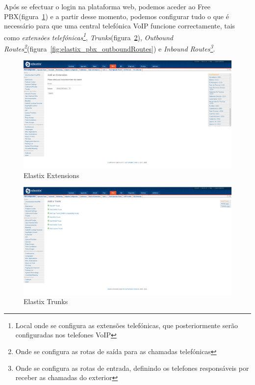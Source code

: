 Após se efectuar o login na plataforma web, podemos aceder ao Free PBX(figura~\ref{fig:elastix_pbx_extensions}) e a partir
desse momento, podemos configurar tudo o que é necessário para que uma central telefónica VoIP funcione correctamente, tais como \emph{extensões telefónicas\footnote{Local onde se configura as extensões telefónicas, que posteriormente serão configuradas nos telefones VoIP}}, \emph{Trunks}(figura~\ref{fig:elastix_pbx_trunk}), \emph{Outbound Routes\footnote{Onde se configura as rotas de saída para as chamadas telefónicas}}(figura~\ref{fig:elastix_pbx_outboundRoutes}) e \emph{Inbound Routes\footnote{Onde se configura as rotas de entrada, definindo os telefones responsáveis por receber as chamadas do exterior}}.

\begin{figure}[H]
    \begin{center}
        \includegraphics[width=13cm]{include/img/elastix_pbx_extensions.png}
    \end{center}
    \caption{Elastix Extensions}
    \label{fig:elastix_pbx_extensions}
\end{figure}

\begin{figure}[H]
    \begin{center}
        \includegraphics[width=13cm]{include/img/elastix_pbx_trunk.png}
    \end{center}
    \caption{Elastix Trunks}
    \label{fig:elastix_pbx_trunk}
\end{figure}

